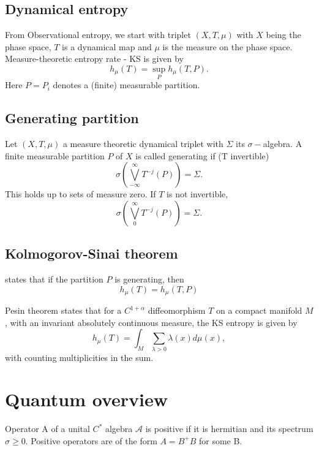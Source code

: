 \documentclass{article}
\newcommand{\x}{$(X,T,\mu) $ }
\begin{document}
\subsection{Dynamical entropy}
From Observational entropy, we start with triplet $(X,T,\mu)$ with $X$ being the phase space, $T$ is a dynamical map and $\mu$ is the measure on the phase space. \\
Measure-theoretic entropy rate - KS is given by
\begin{equation}
    h_\mu(T) = \sup_P{h_\mu(T, P)}.
\end{equation}
Here $P = {P_i}$ denotes a (finite) measurable partition.
\subsection{Generating partition}
Let \x a measure theoretic dynamical triplet with $\Sigma$ its $\sigma-$algebra. 
A finite measurable partition $P$ of $X$ is called generating if (T invertible)
\begin{equation}
    \sigma \left(\bigvee_{-\infty}^\infty T^{-j}(P)\right)=\Sigma. 
\end{equation}
This holds up to sets of measure zero. If $T$ is not invertible, \\
\begin{equation}
    \sigma\left(\bigvee_{0}^\infty T^{-j}(P)\right)=\Sigma.
\end{equation}
\subsection{Kolmogorov-Sinai theorem} states that if the partition $P$ is generating, then 
\begin{equation}
    h_\mu(T) = h_\mu(T, P)
\end{equation}

Pesin theorem states that for a $C^{1+\alpha}$ diffeomorphism $T$ on a compact manifold $M$, with an invariant absolutely continuous measure, the KS entropy is given by 
\begin{equation}
    h_\mu(T) = \int_M\sum_{\lambda>0}\lambda(x) d\mu(x),
\end{equation}
with counting multiplicities in the sum. 
\section{Quantum overview}
Operator A of a unital $C^*$ algebra $\mathcal{A}$ is positive if it is hermitian and its spectrum $\sigma \geq 0$. Positive operators are of the form $A = B^+B$ for some B.  
\end{document}
